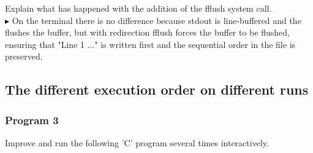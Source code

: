\documentclass[12pt]{article}
\begin{document}
Explain what has happened with the addition of the fflush system call. \\
$\blacktriangleright$ On the terminal there is no difference because stdout is line-buffered and the \n flushes the buffer, but with redirection fflush forces the buffer to be flushed, ensuring that "Line 1 ..." is written first and the sequential order in the file is preserved.

\subsection{The different execution order on different runs}

\subsubsection*{Program 3}
Improve and run the following 'C' program several times interactively.
\inputminted{cpp}{scripts/script-3.c}
\end{document}
